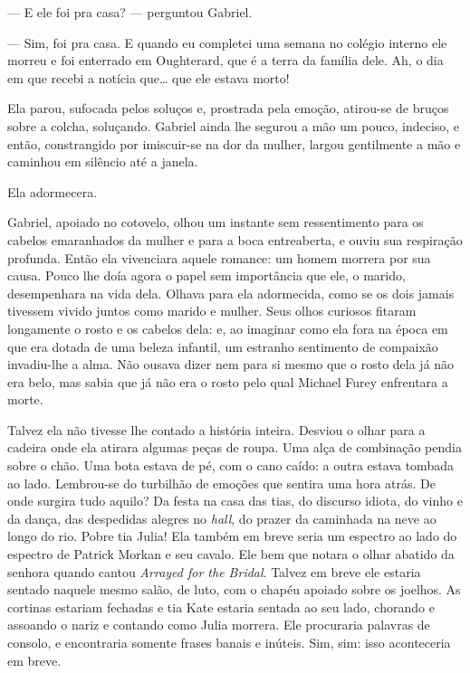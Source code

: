 --- E ele foi pra casa? --- perguntou Gabriel.

--- Sim, foi pra casa.  E quando eu completei uma semana no colégio interno ele
morreu e foi enterrado em Oughterard, que é a terra da família dele.  Ah, o dia
em que recebi a notícia que\ldots{} que ele estava morto!

Ela parou, sufocada pelos soluços e, prostrada pela emoção, atirou-se de bruços
sobre a colcha, soluçando.  Gabriel ainda lhe segurou a mão um pouco, indeciso,
e então, constrangido por imiscuir-se na dor da mulher, largou gentilmente a
mão e caminhou em silêncio até a janela.

\smallskip

\noindent\dotfill

\smallskip

Ela adormecera.

Gabriel, apoiado no cotovelo, olhou um instante sem ressentimento para os
cabelos emaranhados da mulher e para a boca entreaberta, e ouviu sua respiração
profunda.  Então ela vivenciara aquele romance: um homem morrera por sua causa.
Pouco lhe doía agora o papel sem importância que ele, o marido, desempenhara na
vida dela.  Olhava para ela adormecida, como se os dois jamais tivessem vivido
juntos como marido e mulher.  Seus olhos curiosos fitaram longamente o rosto e
os cabelos dela: e, ao imaginar como ela fora na época em que era dotada de uma
beleza infantil, um estranho sentimento de compaixão invadiu-lhe a alma.  Não
ousava dizer nem para si mesmo que o rosto dela já não era belo, mas sabia que
já não era o rosto pelo qual Michael Furey enfrentara a morte.

Talvez ela não tivesse lhe contado a história inteira.  Desviou o olhar para a
cadeira onde ela atirara algumas peças de roupa.  Uma alça de combinação pendia
sobre o chão.  Uma bota estava de pé, com o cano caído: a outra estava tombada
ao lado.  Lembrou-se do turbilhão de emoções que sentira uma hora atrás.  De
onde surgira tudo aquilo?  Da festa na casa das tias, do discurso idiota, do
vinho e da dança, das despedidas alegres no \textit{hall}, do prazer da
caminhada na neve ao longo do rio.  Pobre tia Julia!  Ela também em breve seria
um espectro ao lado do espectro de Patrick Morkan e seu cavalo.  Ele bem que
notara o olhar abatido da senhora quando cantou \textit{Arrayed for the
Bridal}.  Talvez em breve ele estaria sentado naquele mesmo salão, de luto, com
o chapéu apoiado sobre os joelhos.  As cortinas estariam fechadas e tia Kate
estaria sentada ao seu lado, chorando e assoando o nariz e contando como Julia
morrera.  Ele procuraria palavras de consolo, e encontraria somente frases
banais e inúteis.  Sim, sim: isso aconteceria em breve.

